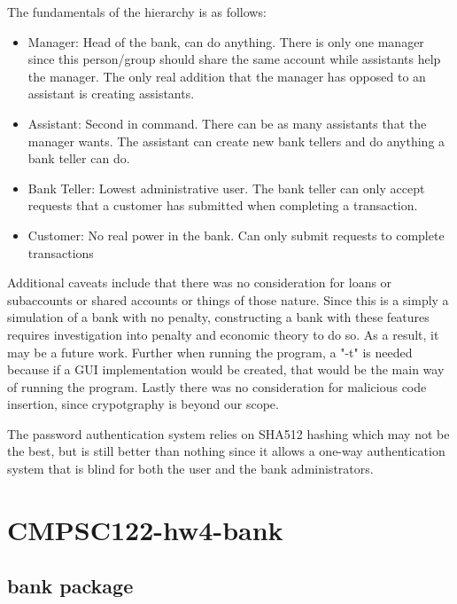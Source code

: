 \documentclass[letterpaper,10pt,english]{sphinxmanual}
\begin{document}
The fundamentals of the hierarchy is as follows:
\begin{itemize}
\item{Manager: Head of the bank, can do anything.  There is only one manager since this person/group should share the same account while assistants help the manager.  The only real addition that the manager has opposed to an assistant is creating assistants.}
\item{Assistant: Second in command.  There can be as many assistants that the manager wants.  The assistant can create new bank tellers and do anything a bank teller can do.}
\item{Bank Teller: Lowest administrative user.  The bank teller can only accept requests that a customer has submitted when completing a transaction.}
\item{Customer: No real power in the bank.  Can only submit requests to complete transactions}
\end{itemize}

Additional caveats include that there was no consideration for loans or subaccounts or shared accounts or things of those nature.  Since this is a simply a simulation of a bank with no penalty, constructing a bank with these features requires investigation into penalty and economic theory to do so.  As a result, it may be a future work.  Further when running the program, a "-t" is needed because if a GUI implementation would be created, that would be the main way of running the program.  Lastly there was no consideration for malicious code insertion, since crypotgraphy is beyond our scope.

The password authentication system relies on SHA512 hashing which may not be the best, but is still better than nothing since it allows a one-way authentication system that is blind for both the user and the bank administrators.

\chapter{CMPSC122-hw4-bank}
\label{\detokenize{modules:welcome-to-cmpsc122-hw4-bank-s-documentation}}\label{\detokenize{modules:cmpsc122-hw4-bank}}\label{\detokenize{modules::doc}}

\section{bank package}
\label{\detokenize{bank:bank-package}}\label{\detokenize{bank::doc}}
\end{document}
